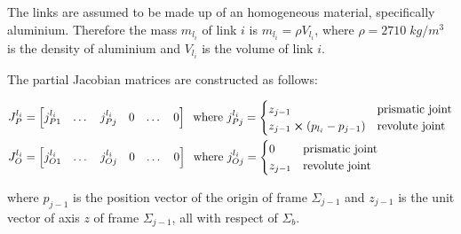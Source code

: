 The links are assumed to be made up of an homogeneous material, specifically aluminium. Therefore the mass $m_{l_i}$ of link $i$ is $m_{l_i}=\rho V_{l_i}$, where $\rho=2710\;kg/m^3$ is the density of aluminium and $V_{l_i}$ is the volume of link $i$.

\newpage

The partial Jacobian matrices are constructed as follows:

\begin{align*}
J_P^{l_i}&=\begin{bmatrix}
j_{P1}^{l_i}&\dots&j_{Pj}^{l_i}& 0&\dots&0
\end{bmatrix}\;\;\text{where }j_{Pj}^{l_i}=\begin{cases}
z_{j-1}&\text{prismatic joint}\\
z_{j-1}\cross(p_{l_i}-p_{j-1})&\text{revolute joint}\\
\end{cases}\\
J_O^{l_i}&=\begin{bmatrix}
j_{O1}^{l_i}&\dots&j_{Oj}^{l_i}& 0&\dots&0
\end{bmatrix}\;\;\text{where }j_{Oj}^{l_i}=\begin{cases}
0&\text{prismatic joint}\\
z_{j-1}&\text{revolute joint}\\
\end{cases}
\end{align*}

where $p_{j-1}$ is the position vector of the origin of frame $\Sigma_{j-1}$ and $z_{j-1}$ is the unit vector of axis $z$ of frame $\Sigma_{j-1}$, all with respect of $\Sigma_b$.

